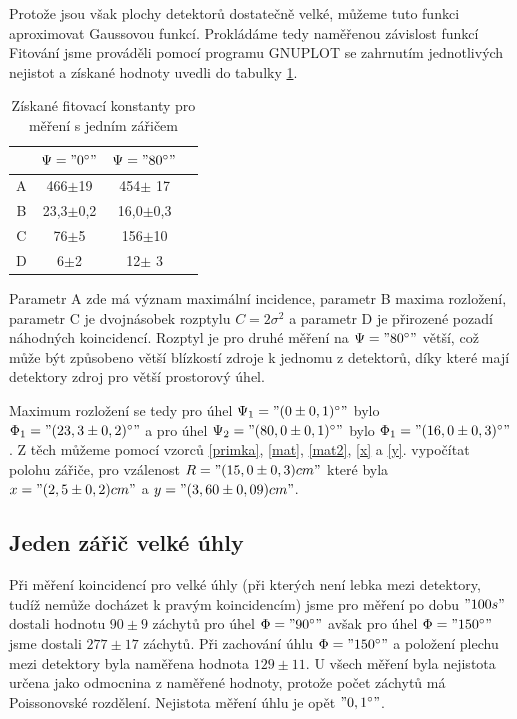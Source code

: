 \documentclass[10pt,a4paper]{article}
\begin{document}
Protože jsou však plochy detektorů dostatečně velké, můžeme tuto funkci aproximovat Gaussovou funkcí. Prokládáme tedy naměřenou závislost funkcí
Fitování jsme prováděli pomocí programu GNUPLOT se zahrnutím jednotlivých nejistot a získané hodnoty uvedli do tabulky \ref{konstanty1}.
\begin{table}[h]
\centering
\caption{Získané fitovací konstanty pro měření s jedním zářičem}
\label{konstanty1}
\begin{tabular}{|c|c|c|c|}
\hline
&$\Psi="0 ^\circ"$&$\Psi="80 ^\circ"$\\
\hline
A&	466$\pm$19&454$\pm$	17\\
B&	23,3$\pm$0,2&	16,0$\pm$0,3\\
C&	76$\pm$5&156$\pm$10\\
D&	6$\pm$2&	12$\pm$	3\\
\hline
\end{tabular}
\end{table}
Parametr A zde má význam maximální incidence, parametr B maxima rozložení, parametr C je dvojnásobek rozptylu $C=2\sigma^2$ a parametr D je přirozené pozadí náhodných koincidencí. Rozptyl je pro druhé měření na $\Psi="80 ^\circ"$ větší, což může být způsobeno větší blízkostí zdroje k jednomu z detektorů, díky které mají detektory zdroj  pro větší prostorový úhel.

Maximum rozložení se tedy pro úhel $\Psi_1="(0\pm0,1) ^\circ"$ bylo $\Phi_1="(23,3\pm0,2) ^\circ"$ a pro úhel $\Psi_2="(80,0\pm0,1) ^\circ"$ bylo $\Phi_1="(16,0\pm0,3) ^\circ"$.
Z těch můžeme pomocí vzorců \eqref{primka}, \eqref{mat},  \eqref{mat2},  \eqref{x} a  \eqref{y}.
vypočítat polohu zářiče, pro vzálenost $R="(15,0\pm0,3) cm"$ které byla $x="(2,5\pm0,2) cm"$ a $y="(3,60\pm0,09) cm"$. 
\subsection*{Jeden zářič velké úhly}
Při měření koincidencí pro velké úhly (při kterých není lebka mezi detektory, tudíž nemůže docházet k pravým koincidencím) jsme pro měření po dobu $"100 s"$ dostali hodnotu $90\pm9$ záchytů pro úhel $\Phi = "90^\circ"$ avšak pro úhel $\Phi="150 ^\circ"$ jsme dostali $277\pm17$ záchytů.  Při zachování úhlu $\Phi="150 ^\circ"$ a položení plechu mezi detektory byla naměřena hodnota $129\pm11$. U všech měření byla nejistota určena jako odmocnina z naměřené hodnoty, protože počet záchytů má Poissonovské rozdělení. Nejistota měření úhlu je opět $"0,1 ^\circ"$.
\end{document}
